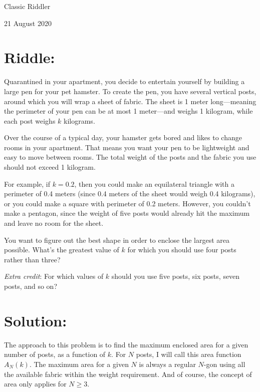\documentclass{article}
\begin{document}
\pagestyle{empty} %

\begin{center}
{\LARGE Classic Riddler}

\vspace{0.15in}

{\Large 21 August 2020}
\end{center}


\section*{Riddle:}

Quarantined in your apartment, you decide to entertain yourself by building a large pen for your pet hamster.
To create the pen, you have several vertical posts, around which you will wrap a sheet of fabric.
The sheet is 1 meter long---meaning the perimeter of your pen can be at most 1 meter---and weighs 1 kilogram, while each post weighs $k$ kilograms.

Over the course of a typical day, your hamster gets bored and likes to change rooms in your apartment.
That means you want your pen to be lightweight and easy to move between rooms.
The total weight of the posts and the fabric you use should not exceed 1 kilogram.

For example, if $k=0.2$, then you could make an equilateral triangle with a perimeter of 0.4 meters (since 0.4 meters of the sheet would weigh 0.4 kilograms), or you could make a square with perimeter of 0.2 meters.
However, you couldn't make a pentagon, since the weight of five posts would already hit the maximum and leave no room for the sheet.

You want to figure out the best shape in order to enclose the largest area possible.
What's the greatest value of $k$ for which you should use four posts rather than three?

\textit{Extra credit}: For which values of $k$ should you use five posts, six posts, seven posts, and so on?

\section*{Solution:}

The approach to this problem is to find the maximum enclosed area for a given number of posts, as a function of $k$.
For $N$ posts, I will call this area function $A_{N}(k)$.
The maximum area for a given $N$ is always a regular $N$-gon using all the available fabric within the weight requirement.
And of course, the concept of area only applies for $N\geq3$.
\end{document}
